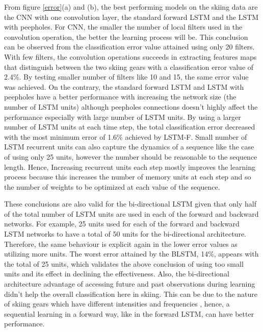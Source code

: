 \documentclass[12pt,a4paper]{article}
\begin{document}
From figure \ref{error}(a) and (b), the best performing models on the skiing data are the CNN with one convolution layer, the standard forward LSTM and the LSTM with peepholes. For CNN, the smaller the number of local filters used in the convolution operation, the better the learning process will be. This conclusion can be observed from the classification error value attained using only 20 filters. With few filters, the convolution operations succeeds in extracting features maps that distinguish between the two skiing gears with a classification error value of	2.4\%. By testing smaller number of filters like 10 and 15, the same error value was achieved. On the contrary, the standard forward LSTM and LSTM with peepholes have a better performance with increasing the network size (the number of LSTM units) although peepholes connections doesn't highly affect the performance especially with large number of LSTM units. %
 By using a larger number of LSTM units at each time step, the total classification error decreased with the most minimum error of 1.6\% achieved by LSTM-F. Small number of LSTM recurrent units can also capture the dynamics of a sequence like the case of using only 25 units, however the number should be reasonable to the sequence length. Hence, Increasing recurrent units each step mostly improves the learning process because this increases the number of memory units at each step and so the number of weights to be optimized at each value of the sequence. 
 
These conclusions are also valid for the bi-directional LSTM given that only half of the total number of LSTM units are used in each of the forward and backward networks. For example, 25 units used for each of the forward and backward LSTM networks to have a total of 50 units for the bi-directional architecture. Therefore, the same behaviour is explicit again in the lower error values as utilizing more units. The worst error attained by the BLSTM, 14\%, appears with the total of 25 units, which validates the above conclusion of using too small units and its effect in declining the effectiveness. Also, the bi-directional architecture advantage of accessing future and past observations during learning didn't help the overall classification here in skiing. This can be due to the nature of skiing gears which have different intensities and frequencies , hence, a sequential learning in a forward way, like in the forward LSTM, can have better performance.
\end{document}
